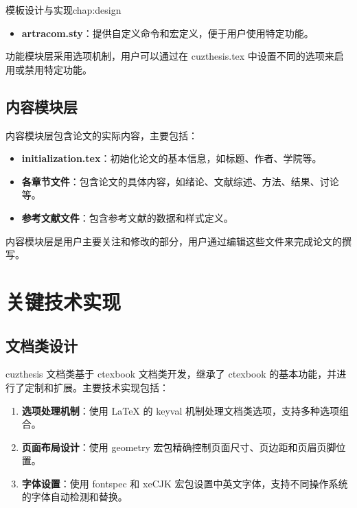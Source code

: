 \begin{cuzchapter}{模板设计与实现}{chap:design}
\begin{itemize}
        \item \textbf{artracom.sty}：提供自定义命令和宏定义，便于用户使用特定功能。
    \end{itemize}

    功能模块层采用选项机制，用户可以通过在 cuzthesis.tex 中设置不同的选项来启用或禁用特定功能。

    \subsection{内容模块层}

    内容模块层包含论文的实际内容，主要包括：

    \begin{itemize}
        \item \textbf{initialization.tex}：初始化论文的基本信息，如标题、作者、学院等。

        \item \textbf{各章节文件}：包含论文的具体内容，如绪论、文献综述、方法、结果、讨论等。

        \item \textbf{参考文献文件}：包含参考文献的数据和样式定义。
    \end{itemize}

    内容模块层是用户主要关注和修改的部分，用户通过编辑这些文件来完成论文的撰写。

    \section{关键技术实现}\label{sec:key-technologies}

    \subsection{文档类设计}

    cuzthesis 文档类基于 ctexbook 文档类开发，继承了 ctexbook 的基本功能，并进行了定制和扩展。主要技术实现包括：

    \begin{enumerate}
        \item \textbf{选项处理机制}：使用 LaTeX 的 keyval 机制处理文档类选项，支持多种选项组合。

        \item \textbf{页面布局设计}：使用 geometry 宏包精确控制页面尺寸、页边距和页眉页脚位置。

        \item \textbf{字体设置}：使用 fontspec 和 xeCJK 宏包设置中英文字体，支持不同操作系统的字体自动检测和替换。


\end{enumerate}
\end{cuzchapter}
